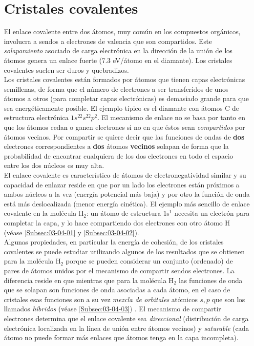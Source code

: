 \section{Cristales covalentes}

El enlace covalente entre dos átomos, muy común en los compuestos orgánicos, involucra a sendos a electrones de valencia  que son compartidos. Este \textit{solapamiento} asociado de carga electrónica en la dirección de la unión de los átomos genera un enlace fuerte (7.3 eV/átomo en el diamante). Los cristales covalentes suelen ser duros y quebradizos. \\

Los cristales covalentes están formados por átomos que tienen capas electrónicas semillenas, de forma que el número de electrones a ser transferidos de unos átomos a otros (para completar capas electrónicas) es demasiado grande para que sea energéticamente posible. El ejemplo típico es el diamante con átomos C de estructura electrónica $1s^22s^22p^2$. El mecanismo de enlace no se basa por tanto en que los átomos cedan o ganen electrones si no en que éstos sean \textit{compartidos} por átomos vecinos. Por compartir se quiere decir que las funciones de ondas de \textbf{dos} electrones correspondientes a \textbf{dos} átomos \textbf{vecinos} solapan de forma que la probabilidad de encontrar cualquiera de los dos electrones en todo el espacio entre los dos núcleos es muy alta. \\

El enlace covalente es característico de átomos de electronegatividad similar y su capacidad de enlazar reside en que por un lado los electrones están próximos a ambos núcleos a la vez (energía potencial más baja) y por otro la función de onda está más deslocalizada (menor energía cinética). El ejemplo más sencillo de enlace covalente en la molécula H$_2$: un átomo de estructura 1s$^1$ necesita un electrón para completar la capa, y lo hace compartiendo dos electrones con otro átomo H (véase \ref{Subsec:03-04-01} y \ref{Subsec:03-04-02}). \\

Algunas propiedades, en particular la energía de cohesión, de los cristales covalentes se puede estudiar utilizando algunos de los resultados que se obtienen para la molécula H$_2$ porque se pueden considerar un conjunto (ordenado) de pares de átomos unidos por el mecanismo de compartir sendos electrones. La diferencia reside en que mientras que para la molécula H$_2$ las funciones de onda que se solapan son funciones de onda asociadas a cada átomo, en el caso de cristales esas funciones son a su vez \textit{mezcla de orbitales} atómicos $s,p$ que son los llamados \textit{híbridos} (véase \ref{Subsec:03-04-03}) . El mecanismo de compartir electrones determina que el enlace covalente sea \textit{direccional} (distribución de carga electrónica localizada en la línea de unión entre átomos vecinos) y \textit{saturable} (cada átomo no puede formar más enlaces que átomos tenga en la capa incompleta).

